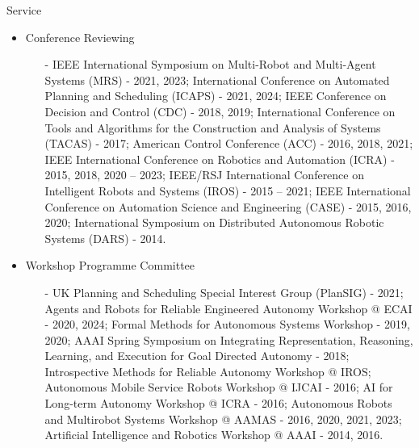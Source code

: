 \begin{rSection}{Service}
\begin{itemize}
\item{Conference Reviewing}
\begin{itemize}
\vspace*{-0.2cm}
\item[-]  IEEE International Symposium on Multi-Robot and Multi-Agent Systems (MRS) - 2021, 2023; International Conference on Automated Planning and Scheduling (ICAPS) - 2021, 2024; IEEE Conference on Decision and Control (CDC) - 2018, 2019; International Conference on Tools and Algorithms for the Construction and Analysis of Systems (TACAS) - 2017; American Control Conference (ACC) - 2016, 2018, 2021; IEEE International Conference on Robotics and Automation (ICRA) - 2015, 2018, 2020 -- 2023; IEEE/RSJ International Conference on Intelligent Robots and Systems (IROS) - 2015 -- 2021; IEEE International Conference on Automation Science and Engineering (CASE) - 2015, 2016, 2020;  International Symposium on Distributed Autonomous Robotic Systems (DARS) - 2014.
\end{itemize}


\item{Workshop Programme Committee}
\begin{itemize}
\vspace*{-0.2cm}
\item[-] UK Planning and Scheduling Special Interest Group (PlanSIG) - 2021; Agents and Robots for Reliable Engineered Autonomy Workshop @ ECAI - 2020, 2024; Formal Methods for Autonomous Systems Workshop - 2019, 2020;  AAAI Spring Symposium on Integrating Representation, Reasoning, Learning, and Execution for Goal Directed Autonomy - 2018; Introspective Methods for Reliable Autonomy Workshop @ IROS; Autonomous Mobile Service Robots Workshop @ IJCAI - 2016; AI for Long-term Autonomy Workshop @ ICRA - 2016; Autonomous Robots and Multirobot Systems Workshop @ AAMAS - 2016, 2020, 2021, 2023; Artificial Intelligence and Robotics Workshop  @ AAAI - 2014, 2016.
\end{itemize}

\end{itemize}



\end{rSection}
